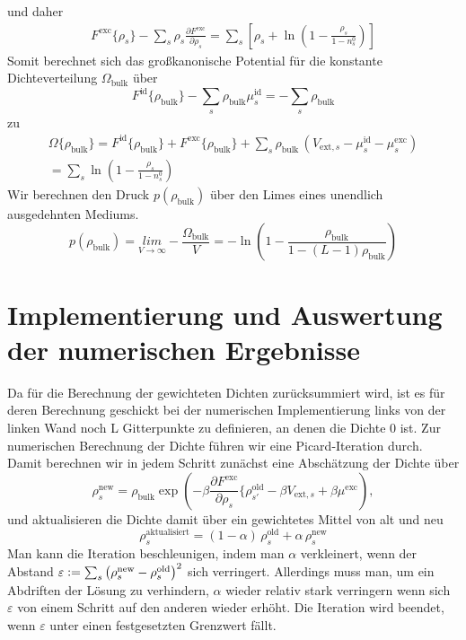 \documentclass[12pt]{article}
\begin{document}
und daher
\begin{gather*}
F^\text{exc}\{\rho_s\}-\sum_s\rho_s\frac{\partial{F}^\text{exc}}{\partial\rho_s}=\sum_s\left[\rho_s+\ln(1-\frac{\rho_s}{1-n^0_s})\right]\end{gather*}
Somit berechnet sich das großkanonische Potential für die konstante Dichteverteilung $\Omega_\text{bulk}$
über 
$$F^\text{id}\{\rho_\text{bulk}\}-\sum_s\rho_\text{bulk}\mu^\text{id}_s=-\sum_s\rho_\text{bulk}$$
zu
\begin{gather*}\Omega\{\rho_\text{bulk}\}=F^\text{id}\{\rho_\text{bulk}\}+F^\text{exc}\{\rho_\text{bulk}\}+\sum_s\rho_\text{bulk}\,(V_{\text{ext},s}-\mu^\text{id}_s-\mu^\text{exc}_s)\\
=\sum_s\ln(1-\frac{\rho_s}{1-n^0_s})\end{gather*}
Wir berechnen den Druck $p(\rho_\text{bulk})$ über den Limes eines unendlich ausgedehnten Mediums.
$$p(\rho_\text{bulk})=\underset{V\rightarrow\infty}{lim}-\frac{\Omega_\text{bulk}}{V}=-\ln(1-\frac{\rho_\text{bulk}}{1-(L-1)\rho_\text{bulk}})$$

 \section{Implementierung und Auswertung der numerischen Ergebnisse}
Da für die Berechnung der gewichteten Dichten zurücksummiert wird, ist es für deren Berechnung geschickt bei der numerischen Implementierung links von der linken Wand noch L Gitterpunkte zu definieren, an denen die Dichte 0 ist. Zur numerischen Berechnung der Dichte führen wir eine Picard-Iteration durch. Damit berechnen wir in jedem Schritt zunächst eine Abschätzung der Dichte über
\begin{equation*}\rho_s^\text{new}=\rho_\text{bulk}\exp\left(-\beta\frac{\partial{F^\text{exc}}}{\partial\rho_s}\{\rho_{s'}^\text{old}-\beta{V}_{\text{ext},s}+\beta\mu^\text{exc}\right),\end{equation*}
und aktualisieren die Dichte damit über ein gewichtetes Mittel von alt und neu
$$\rho_s^\text{aktualisiert}=(1-\alpha)\,\rho_s^\text{old}+\alpha\,\rho_s^\text{new}$$
Man kann die Iteration beschleunigen, indem man $\alpha$ verkleinert, wenn der Abstand $\varepsilon\vcentcolon=\sum_s\left(\rho_s^\text{new}-\rho_s^\text{old}\right)^2$ sich verringert. Allerdings muss man, um ein Abdriften der Lösung zu verhindern, $\alpha$ wieder relativ stark verringern wenn sich $\varepsilon$ von einem Schritt auf den anderen wieder erhöht. Die Iteration wird beendet, wenn $\varepsilon$ unter einen festgesetzten Grenzwert fällt.\newline\newline
\end{document}
